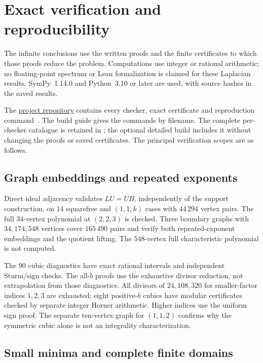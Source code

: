 \section{Exact verification and reproducibility}
\label{sec:verification}

The infinite conclusions use the written proofs and the finite certificates
to which those proofs reduce the problem. Computations use integer or
rational arithmetic; no floating-point spectrum or Lean formalization is
claimed for these Laplacian results. SymPy~1.14.0 and Python~3.10 or later
are used, with source hashes in the saved results.

The \href{https://github.com/the-omega-institute/ideal-intersection-laplacian}{project repository}
contains every checker, exact certificate and reproduction command~\cite{repository}.
The build guide gives the commands by filename. The complete per-checker
catalogue is retained in ;
the optional detailed build includes it without changing the proofs or
saved certificates. The principal verification scopes are as follows.

\subsection{Graph embeddings and repeated exponents}

Direct ideal adjacency validates $LU=UB$, independently of the support
construction, on $14$ squarefree and $(1,1,k)$ cases with $44\,294$
vertex pairs. The full $34$-vertex polynomial at $(2,2,3)$ is checked.
Three boundary graphs with $34,174,548$ vertices cover $165\,490$ pairs
and verify both repeated-exponent embeddings and the quotient lifting.
The $548$-vertex full characteristic polynomial is not computed.

The $90$ cubic diagnostics have exact rational intervals and independent
Sturm/sign checks. The all-$b$ proofs use the exhaustive divisor reduction,
not extrapolation from those diagnostics. All divisors of $24,108,320$
for smaller-factor indices $1,2,3$ are exhausted; eight positive-$b$
cubics have modular certificates checked by separate integer Horner
arithmetic. Higher indices use the uniform sign proof.
The separate ten-vertex graph for $(1,1,2)$ confirms why the symmetric
cubic alone is not an integrality characterization.

\subsection{Small minima and complete finite domains}

